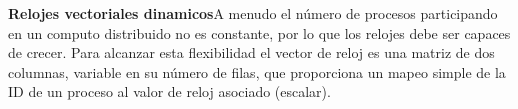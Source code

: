 \documentclass{article}
\begin{document}
    \textbf{Relojes vectoriales dinamicos}A menudo el número de procesos participando en un computo distribuido no es constante, por lo que los relojes debe ser capaces de crecer. Para alcanzar esta flexibilidad el vector de reloj es una matriz de dos columnas, variable en su número de filas, que proporciona un mapeo simple de la ID de un proceso al valor de reloj asociado (escalar).
\end{document}
